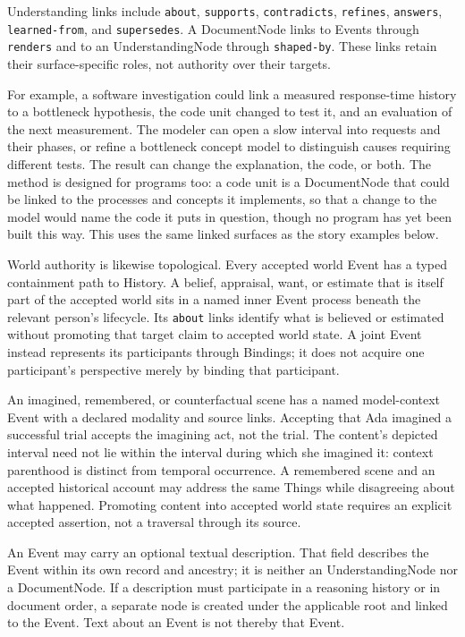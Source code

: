 \documentclass[11pt,a4paper]{article}
\begin{document}
Understanding links include \texttt{about}, \texttt{supports},
\texttt{contradicts}, \texttt{refines}, \texttt{answers},
\texttt{learned-from}, and \texttt{supersedes}. A DocumentNode links to Events
through \texttt{renders} and to an UnderstandingNode through \texttt{shaped-by}.
These links retain their surface-specific roles, not authority over their targets.

For example, a software investigation could link a measured response-time
history to a bottleneck hypothesis, the code unit changed to test it, and an
evaluation of the next measurement. The modeler can open a slow interval into
requests and their phases, or refine a bottleneck concept model to distinguish
causes requiring different tests. The result can change the explanation, the
code, or both. The method is
designed for programs too: a code unit is a DocumentNode that could be linked to
the processes and concepts it implements, so that a change to the model would
name the code it puts in question, though no program has yet been built this way.
This uses the same linked surfaces as the story examples below.

World authority is likewise topological. Every accepted world Event has a typed
containment path to History. A belief, appraisal, want, or estimate that is
itself part of the accepted world sits in a named inner Event process beneath
the relevant person's lifecycle. Its \texttt{about} links identify what is
believed or estimated without promoting that target claim to accepted world
state. A joint Event instead represents its participants through Bindings; it
does not acquire one participant's perspective merely by binding that
participant.

An imagined, remembered, or counterfactual scene has a named model-context
Event with a declared modality and source links. Accepting that Ada imagined a
successful trial accepts the imagining act, not the trial. The content's
depicted interval need not lie within the interval during which she imagined
it: context parenthood is distinct from temporal occurrence. A remembered
scene and an accepted historical account may address the same Things while
disagreeing about what happened. Promoting content into accepted world state
requires an explicit accepted assertion, not a traversal through its source.

An Event may carry an optional textual description. That field describes the
Event within its own record and ancestry; it is neither an UnderstandingNode
nor a DocumentNode. If a description must participate in a reasoning history
or in document order, a separate node is created under the applicable root and
linked to the Event. Text about an Event is not thereby that Event.
\end{document}
